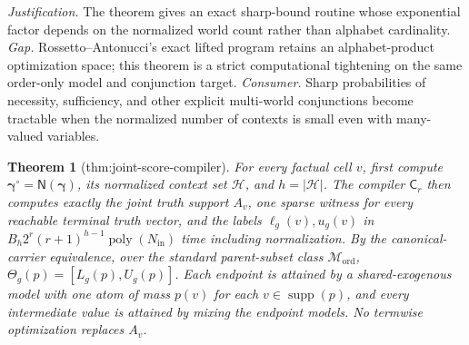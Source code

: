 \documentclass{article}
\newtheorem{theorem}{Theorem}
\begin{document}
\par\smallskip\noindent \textit{Justification.} The theorem gives an exact sharp-bound routine whose exponential factor depends on the normalized world count rather than alphabet cardinality. \textit{Gap.} Rossetto--Antonucci's exact lifted program retains an alphabet-product optimization space; this theorem is a strict computational tightening on the same order-only model and conjunction target. \textit{Consumer.} Sharp probabilities of necessity, sufficiency, and other explicit multi-world conjunctions become tractable when the normalized number of contexts is small even with many-valued variables.

\begin{theorem}[thm:joint-score-compiler]\label{thm:joint-score-compiler}
For every factual cell \(v\), first compute \(\boldsymbol\gamma^{\circ}=\mathsf N(\boldsymbol\gamma)\), its normalized context set \(\mathcal H\), and \(h=|\mathcal H|\). The compiler \(\mathsf C_r\) then computes exactly the joint truth support \(A_v\), one sparse witness for every reachable terminal truth vector, and the labels \(\ell_g(v),u_g(v)\) in \(B_h2^r(r+1)^{h-1}\operatorname{poly}(N_{\mathrm{in}})\) time including normalization. By the canonical-carrier equivalence, over the standard parent-subset class \(\mathcal M_{\mathrm{ord}}\), \(\Theta_g(p)=[L_g(p),U_g(p)]\). Each endpoint is attained by a shared-exogenous model with one atom of mass \(p(v)\) for each \(v\in\operatorname{supp}(p)\), and every intermediate value is attained by mixing the endpoint models. No termwise optimization replaces \(A_v\).
\end{theorem}
\end{document}
